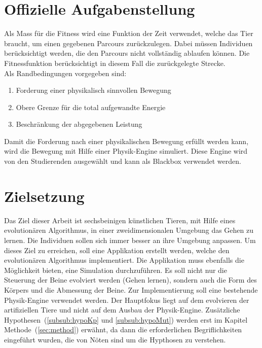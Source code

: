 
  \section{Offizielle Aufgabenstellung}
    Als Mass für die Fitness wird eine Funktion der Zeit verwendet, welche das Tier braucht,
    um einen gegebenen Parcours zurückzulegen.
    Dabei müssen Individuen berücksichtigt werden, die den Parcours nicht vollständig ablaufen können.
    Die Fitnessfunktion berücksichtigt in diesem Fall die zurückgelegte Strecke.
    \\
    Als Randbedingungen vorgegeben sind:
    \begin{enumerate}
      \item Forderung einer physikalisch sinnvollen Bewegung
      \item Obere Grenze für die total aufgewandte Energie
      \item Beschränkung der abgegebenen Leistung
    \end{enumerate}
    Damit die Forderung nach einer physikalischen Bewegung erfüllt werden kann,
    wird die Bewegung mit Hilfe einer Physik-Engine simuliert.
    Diese Engine wird von den Studierenden ausgewählt und kann als Blackbox verwendet werden.

  \section{Zielsetzung}

    Das Ziel dieser Arbeit ist sechsbeinigen künstlichen Tieren, mit Hilfe eines evolutionären Algorithmus, in einer zweidimensionalen Umgebung das Gehen zu lernen.
    Die Individuen sollen sich immer besser an ihre Umgebung anpassen.
    Um dieses Ziel zu erreichen, soll eine Applikation erstellt werden, welche den evolutionären Algorithmus implementiert.
    Die Applikation muss ebenfalls die Möglichkeit bieten, eine Simulation durchzuführen.
    Es soll nicht nur die Steuerung der Beine evolviert werden (Gehen lernen), sondern auch die Form des Körpers und die Abmessung der Beine.
    Zur Implementierung soll eine bestehende Physik-Engine verwendet werden. Der Hauptfokus liegt auf dem evolvieren der artifiziellen Tiere und nicht auf dem Ausbau der Physik-Engine.
    Zusätzliche Hypothesen~(\vref{subsub:hypoKp} und \vref{subsub:hypoMut}) werden erst im Kapitel Methode~(\vref{sec:method}) erwähnt, da dann die erforderlichen Begriflichkeiten eingeführt wurden,
    die von Nöten sind um die Hypthosen zu verstehen.

